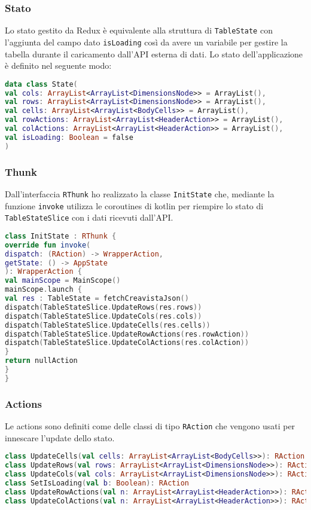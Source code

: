 \subsubsection{Stato}
Lo stato gestito da Redux è equivalente alla struttura di \verb|TableState| con l'aggiunta del campo dato \verb|isLoading| così da avere un variabile per gestire la tabella durante il caricamento dall'API esterna di dati. Lo stato dell'applicazione è definito nel seguente modo:

\begin{lstlisting}[caption={State}, label={lst:bodycells}, language=Kotlin]
data class State(
val cols: ArrayList<ArrayList<DimensionsNode>> = ArrayList(),
val rows: ArrayList<ArrayList<DimensionsNode>> = ArrayList(),
val cells: ArrayList<ArrayList<BodyCells>> = ArrayList(),
val rowActions: ArrayList<ArrayList<HeaderAction>> = ArrayList(),
val colActions: ArrayList<ArrayList<HeaderAction>> = ArrayList(),
val isLoading: Boolean = false
)
\end{lstlisting}

\subsubsection{Thunk}
Dall'interfaccia \verb|RThunk| ho realizzato la classe \verb|InitState| che, mediante la funzione \verb|invoke| utilizza le coroutines di kotlin per riempire lo stato di \verb|TableStateSlice| con i dati ricevuti dall'API.
\begin{lstlisting}[caption={InitState}, label={lst:bodycells}, language=Kotlin]
class InitState : RThunk {
override fun invoke(
dispatch: (RAction) -> WrapperAction, 
getState: () -> AppState
): WrapperAction {
val mainScope = MainScope()
mainScope.launch {
val res : TableState = fetchCreavistaJson()
dispatch(TableStateSlice.UpdateRows(res.rows))
dispatch(TableStateSlice.UpdateCols(res.cols))
dispatch(TableStateSlice.UpdateCells(res.cells))
dispatch(TableStateSlice.UpdateRowActions(res.rowAction))
dispatch(TableStateSlice.UpdateColActions(res.colAction))
}
return nullAction
}
}
\end{lstlisting}

\subsubsection{Actions}
Le actions sono definiti come delle classi di tipo \verb|RAction| che vengono usati per innescare l'update dello stato.

\begin{lstlisting}[caption={Actions}, label={lst:bodycells}, language=Kotlin]
class UpdateCells(val cells: ArrayList<ArrayList<BodyCells>>): RAction
class UpdateRows(val rows: ArrayList<ArrayList<DimensionsNode>>): RAction
class UpdateCols(val cols: ArrayList<ArrayList<DimensionsNode>>): RAction
class SetIsLoading(val b: Boolean): RAction
class UpdateRowActions(val n: ArrayList<ArrayList<HeaderAction>>): RAction
class UpdateColActions(val n: ArrayList<ArrayList<HeaderAction>>): RAction
\end{lstlisting}


